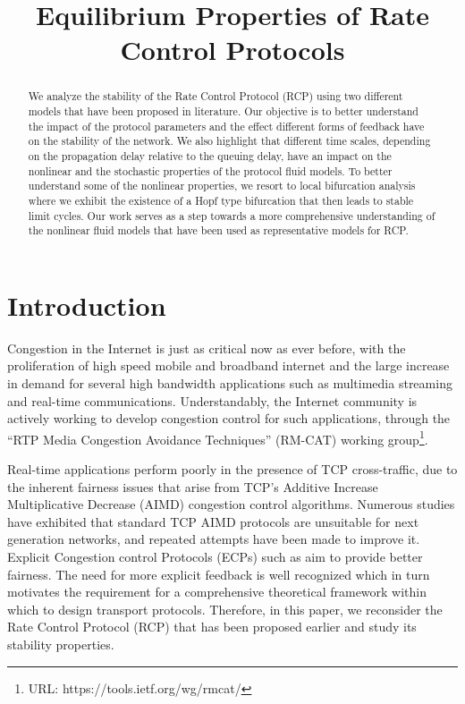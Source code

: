 \documentclass[conference]{IEEEtran}
\begin{document}
\title{Equilibrium Properties of Rate Control Protocols}

\author{
}
\maketitle


\begin{abstract}
We analyze the stability of the Rate Control Protocol (RCP) using two different models that have been
proposed in literature. Our objective is to better understand the impact of the protocol parameters 
and the effect different forms of feedback have on the stability of the network.
We also highlight that different time scales, depending on the propagation delay relative to the queuing delay, 
have an impact on the nonlinear and the stochastic properties of the protocol fluid models. To better understand 
some of the nonlinear properties, we resort to local bifurcation analysis where we exhibit the existence of a
Hopf type bifurcation that then leads to stable limit cycles. Our work serves as a step towards a more comprehensive 
understanding of the nonlinear fluid models that have been used as representative models for RCP. 
\end{abstract}
\IEEEpeerreviewmaketitle

\section{Introduction}

Congestion in the Internet is just as critical now as ever before, with the proliferation of
high speed mobile and broadband internet and the large increase in demand for several high bandwidth 
applications such as multimedia streaming and real-time communications. Understandably, the Internet
community is actively working to develop congestion control for such applications, through the 
``RTP Media Congestion Avoidance Techniques'' (RM-CAT) working group\footnote{URL: https://tools.ietf.org/wg/rmcat/}.

Real-time applications perform poorly in the presence of TCP cross-traffic, due to the inherent fairness 
issues that arise from TCP's Additive Increase Multiplicative 
Decrease (AIMD) congestion control algorithms. Numerous studies have exhibited that standard TCP AIMD protocols 
\cite{tcp1, tcp2} are unsuitable for next generation networks, and repeated attempts have been made to improve it.
Explicit Congestion control Protocols (ECPs) such as \cite{xcp} aim to provide better fairness. 
The need for more explicit feedback is well recognized which in turn motivates the requirement for a comprehensive 
theoretical framework within which to design transport protocols. Therefore, in this paper, we reconsider the Rate 
Control Protocol (RCP) \cite{NanditaPhD} that has been proposed earlier and study its stability properties.
\end{document}
